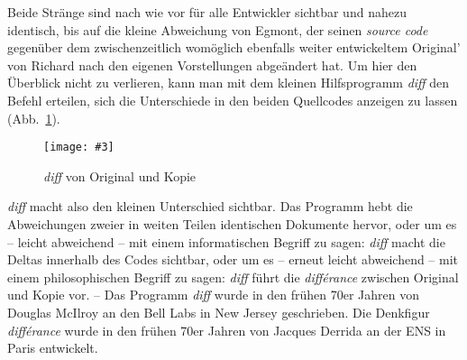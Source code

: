\documentclass[a4paper,12pt]{article}
\newcommand{\pngbild}[4]{\texttt{[image: \#3]}}
\begin{document}
Beide Stränge sind nach wie vor für alle Entwickler sichtbar und nahezu identisch, bis auf die kleine Abweichung von {\color{hokkaido}Egmont}, der seinen \emph{source code} gegenüber dem zwischenzeitlich womöglich ebenfalls weiter entwickeltem Original' von {\color{dzug}Richard} nach den eigenen Vorstellungen abgeändert hat. Um hier den Überblick nicht zu verlieren, kann man mit dem kleinen Hilfsprogramm \emph{diff} den Befehl erteilen, sich die Unterschiede in den beiden Quellcodes anzeigen zu lassen (Abb.~\ref{abb:orikopie}).


\begin{figure}[ht]
\begin{center}
\pngbild{433}{176}{../bilder/OriginalKopie.png}{1.1\textwidth}\\[-3mm]
\caption{\emph{diff} von Original und Kopie}\label{abb:orikopie}
\end{center}
\end{figure}

\emph{diff} macht also den kleinen Unterschied sichtbar. Das Programm hebt die Abweichungen zweier in weiten Teilen identischen Dokumente hervor, oder um es – leicht abweichend – mit einem informatischen Begriff zu sagen: \emph{diff} macht die Deltas innerhalb des Codes sichtbar, oder um es – erneut leicht abweichend – mit einem philosophischen Begriff zu sagen: \emph{diff} führt die \emph{différance} zwischen Original und Kopie vor. – Das Programm \emph{diff} wurde in den frühen 70er Jahren von Douglas McIlroy an den Bell Labs in New Jersey geschrieben. Die Denkfigur \emph{différance} wurde in den frühen 70er Jahren von Jacques Derrida an der ENS in Paris entwickelt. 
\end{document}
